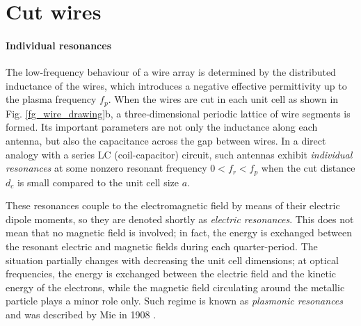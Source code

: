
\FloatBarrier %
\section{Cut wires} \label{section_cutwires}%
\paragraph{Individual resonances}%
The low-frequency behaviour of a wire array is determined by the distributed inductance of the wires, which introduces a negative effective permittivity up to the plasma frequency $f_p$. When the wires are cut in each unit cell as shown in Fig. \ref{fg_wire_drawing}b, a three-dimensional periodic lattice of wire segments is formed. Its important parameters are not only the inductance along each antenna, but also the capacitance across the gap between wires. In a direct analogy with a series LC (coil-capacitor) circuit, such antennas exhibit \textit{individual resonances} at some nonzero resonant frequency $0<f_r<f_p$ when the cut distance  $d_c$ is small compared to the unit cell size $a$. 

These resonances couple to the electromagnetic field by means of their electric dipole moments, so they are denoted shortly as \textit{electric resonances}. This does not mean that no magnetic field is involved; in fact, the energy is exchanged between the resonant electric and magnetic fields during each quarter-period. The situation partially changes with decreasing the unit cell dimensions; at optical frequencies, the energy is exchanged between the electric field and the kinetic energy of the electrons, while the magnetic field circulating around the metallic particle plays a minor role only. Such regime is known as \textit{plasmonic resonances} and was described by Mie in 1908 \cite{mie1908beitrage}.

